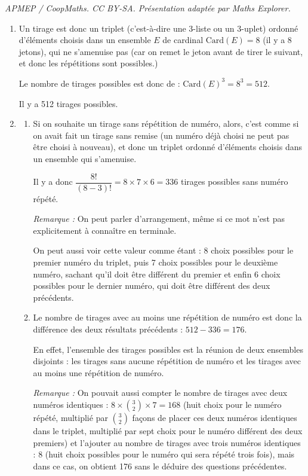 \documentclass[10pt]{article}
\begin{document}
\noindent\textit{APMEP / CoopMaths. CC BY-SA. Présentation adaptée par Maths Explorer.}\par\medskip
\medskip
\begin{enumerate}
\item Un tirage est donc un triplet (c'est-à-dire une 3-liste ou un 3-uplet) ordonné d'éléments choisis dans un ensemble $E$ de cardinal $\mathrm{Card}(E) =8$ (il y a 8 jetons), qui ne s'amenuise pas (car on remet le jeton avant de tirer le suivant, et donc les répétitions sont possibles.)

Le nombre de tirages possibles est donc de : \quad $\mathrm{Card}(E)^3 = 8^3 = 512$.

Il y a 512 tirages possibles.

\item \begin{enumerate}
	\item Si on souhaite un tirage sans répétition de numéro, alors, c'est comme si on avait fait un tirage sans remise (un numéro déjà choisi ne peut pas être choisi à nouveau), et donc un triplet ordonné d'éléments choisis dans un ensemble qui s'amenuise.

	Il y a donc $\dfrac{8!}{(8-3)!} = 8 \times 7 \times 6 = 336$ tirages possibles sans numéro répété.

	\emph{Remarque :} On peut parler d'arrangement, même si ce mot n'est pas explicitement à connaître en terminale.

	On peut aussi voir cette valeur comme étant : 8 choix possibles pour le premier numéro du triplet, puis 7 choix possibles pour le deuxième numéro, sachant qu'il doit être différent du premier et enfin 6 choix possibles pour le dernier numéro, qui doit être différent des deux précédents.

	\item Le nombre de tirages avec au moins une répétition de numéro est donc la différence des deux résultats précédents : $512 - 336 = 176$.

	En effet, l'ensemble des tirages possibles est la réunion de deux ensembles disjoints : les tirages sans aucune répétition de numéro et les tirages avec au moins une répétition de numéro.

	\emph{Remarque :} On pouvait aussi compter le nombre de tirages avec deux numéros identiques : $8 \times \displaystyle \binom{3}{2} \times 7= 168$ (huit choix pour le numéro répété, multiplié par $\displaystyle \binom{3}{2}$ façons de placer ces deux numéros identiques dans le triplet, multiplié par sept choix pour le numéro différent des deux premiers) et l'ajouter au nombre de tirages avec trois numéros identiques : $8$ (huit choix possibles pour le numéro qui sera répété trois fois), mais dans ce cas, on obtient 176 sans le déduire des questions précédentes.
\end{enumerate}


\end{enumerate}
\end{document}
